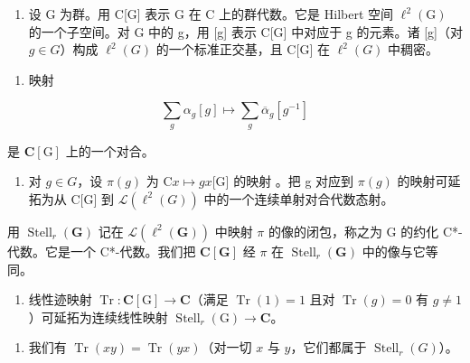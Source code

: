 \begin{enumerate}
\def\labelenumi{\arabic{enumi})}
\setcounter{enumi}{24}
\tightlist
\item
  设 G 为群。用 C{[}G{]} 表示 G 在 C 上的群代数。它是 Hilbert 空间 \(\ell^{2}(\mathrm{G})\) 的一个子空间。对 G 中的 g，用 {[}g{]} 表示 C{[}G{]} 中对应于 g 的元素。诸 {[}g{]}（对 \(g \in G\)）构成 \(\ell^{2}(G)\) 的一个标准正交基，且 C{[}G{]} 在 \(\ell^{2}(G)\) 中稠密。
\end{enumerate}

\begin{enumerate}
\def\labelenumi{\alph{enumi})}
\tightlist
\item
  映射
\end{enumerate}

\[
\sum_ {g} \alpha_ {g} [ g ] \mapsto \sum_ {g} \overline {{\alpha}} _ {g} [ g ^ {- 1} ]
\]

是 \(\mathbf{C}[\mathrm{G}]\) 上的一个对合。

\begin{enumerate}
\def\labelenumi{\alph{enumi})}
\setcounter{enumi}{1}
\tightlist
\item
  对 \(g \in G\)，设 \(\pi(g)\) 为 C\(x \mapsto gx\)[{G}]{ 的映射 }。把 g 对应到 \(\pi(g)\) 的映射可延拓为从 C{[}G{]} 到 \(\mathcal{L}(\ell^{2}(G))\) 中的一个连续单射对合代数态射。
\end{enumerate}

用 \(\operatorname{Stell}_{r}(\mathbf{G})\) 记在 \(\mathcal{L}(\ell^{2}(\mathbf{G}))\) 中映射 \(\pi\) 的像的闭包，称之为 G 的约化 C*-代数。它是一个 C*-代数。我们把 \(\mathbf{C}[\mathbf{G}]\) 经 \(\pi\) 在 \(\operatorname{Stell}_{r}(\mathbf{G})\) 中的像与它等同。

\begin{enumerate}
\def\labelenumi{\alph{enumi})}
\setcounter{enumi}{2}
\tightlist
\item
  线性迹映射 \(\operatorname{Tr} \colon \mathbf{C}[\mathrm{G}] \to \mathbf{C}\)（满足 \(\operatorname{Tr}(1) = 1\) 且对 \(\operatorname{Tr}(g) = 0\) 有 \(g \neq 1\)）可延拓为连续线性映射 \(\operatorname{Stell}_r(\mathrm{G}) \to \mathbf{C}\)。
\end{enumerate}

\begin{enumerate}
\def\labelenumi{\alph{enumi})}
\setcounter{enumi}{3}
\tightlist
\item
  我们有 \(\operatorname{Tr}(xy) = \operatorname{Tr}(yx)\)（对一切 \(x\) 与 \(y\)，它们都属于 \(\operatorname{Stell}_r(G) \)）。
\end{enumerate}

